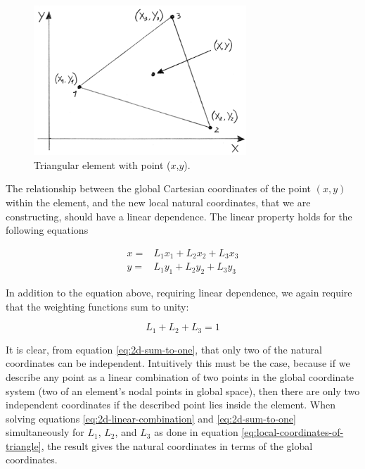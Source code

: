 \begin{figure}
  \centering
  \includegraphics[width=8cm]{./images/finite_element_method_point_in_triangle.png}
\caption{Triangular element with point ($x$,$y$).}
\label{fig:point-in-triangle}
\end{figure}

The relationship between the global Cartesian coordinates of the point
$(x,y)$ within the element, and the new local natural coordinates, that we
are constructing, should have a linear dependence. The linear property
holds for the following equations

\begin{equation}
\begin{aligned}
\label{eq:2d-linear-combination}
x =& L_1 x_1 + L_2 x_2 + L_3 x_3 \\
y =& L_1 y_1 + L_2 y_2 + L_3 y_3
\end{aligned}
\end{equation}

In addition to the equation above, requiring linear dependence, we
again require that the weighting functions sum to unity:

\begin{equation}
\label{eq:2d-sum-to-one}
L_1 + L_2 + L_3 = 1
\end{equation}

It is clear, from equation \eqref{eq:2d-sum-to-one}, that only two of
the natural coordinates can be independent. Intuitively this must be
the case, because if we describe any point as a linear combination of
two points in the global coordinate system (two of an element's nodal
points in global space), then there are only two independent
coordinates if the described point lies inside the element.
When solving  equations \eqref{eq:2d-linear-combination} and
\eqref{eq:2d-sum-to-one} simultaneously for $L_1$, $L_2$, and $L_3$ as
done in equation \eqref{eq:local-coordinates-of-triangle}, the result
gives the natural coordinates in terms of the global coordinates.

